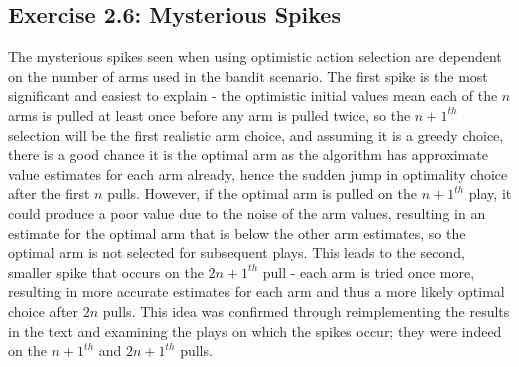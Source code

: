 \subsection*{Exercise 2.6: Mysterious Spikes}

The mysterious spikes seen when using optimistic action selection are dependent on the number of arms used in the bandit scenario. The first spike is the most significant and easiest to explain - the optimistic initial values mean each of the $n$ arms is pulled at least once before any arm is pulled twice, so the $n+1^{th}$ selection will be the first realistic arm choice, and assuming it is a greedy choice, there is a good chance it is the optimal arm as the algorithm has approximate value estimates for each arm already, hence the sudden jump in optimality choice after the first $n$ pulls. However, if the optimal arm is pulled on the $n + 1^{th}$ play, it could produce a poor value due to the noise of the arm values, resulting in an estimate for the optimal arm that is below the other arm estimates, so the optimal arm is not selected for subsequent plays. This leads to the second, smaller spike that occurs on the $2n + 1^{th}$ pull - each arm is tried once more, resulting in more accurate estimates for each arm and thus a more likely optimal choice after $2n$ pulls. This idea was confirmed through reimplementing the results in the text and examining the plays on which the spikes occur; they were indeed on the $n+1^{th}$ and $2n + 1^{th}$ pulls.

